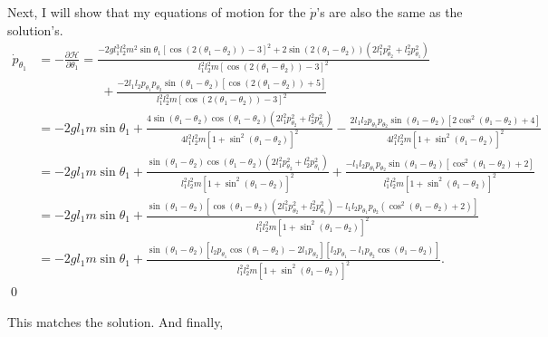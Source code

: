 \documentclass{article}
\theoremstyle{definition}
\newcommand{\p}{\partial}
\newcommand{\ham}{\mathcal{H}}
\newcommand{\f}[2]{\frac{#1}{#2}}
\newcommand{\lb}{\left[}
\newcommand{\rb}{\right]}
\begin{document}
\noindent Next, I will show that my equations of motion for the $\dot{p}$'s are also the same as the solution's.
\begin{align*}
\dot{p}_{\theta_1} &= -\f{\p \ham}{\p \theta_1}  = 
\frac{-2 g l_1^3 l_2^2 m^2 \sin \theta_1[\cos(2 (\theta_1-\theta_2))-3]^2+2 \sin (2(\theta_1-\theta_2)) \left(2 l_1^2p_{\theta_2}^2+l_2^2 p_{\theta_1}^2\right)}{l_1^2 l_2^2 m [\cos (2(\theta_1-\theta_2))-3]^2} \\
&\quad\quad\quad\quad\quad+ \frac{-2l_1l_2 p_{\theta_1}p_{\theta_2} \sin(\theta_1-\theta_2) [\cos (2 (\theta_1-\theta_2))+5]}{l_1^2 l_2^2 m [\cos (2(\theta_1-\theta_2))-3]^2}\\
&= -2gl_1m \sin\theta_1 + \f{4\sin(\theta_1-\theta_2)\cos(\theta_1-\theta_2)\left(2 l_1^2p_{\theta_2}^2+l_2^2 p_{\theta_1}^2\right)}{4l_1^2l_2^2m[1+\sin^2(\theta_1-\theta_2)]^2}
- \frac{2l_1l_2 p_{\theta_1}p_{\theta_2} \sin(\theta_1-\theta_2) [2\cos^2 (\theta_1-\theta_2)+4]}{4l_1^2l_2^2m[1+\sin^2(\theta_1-\theta_2)]^2}\\
&= -2gl_1m \sin\theta_1 + \f{\sin(\theta_1-\theta_2)\cos(\theta_1-\theta_2)\left(2 l_1^2p_{\theta_2}^2+l_2^2 p_{\theta_1}^2\right)}{l_1^2l_2^2m[1+\sin^2(\theta_1-\theta_2)]^2}+ \frac{-l_1l_2 p_{\theta_1}p_{\theta_2} \sin(\theta_1-\theta_2) [\cos^2 (\theta_1-\theta_2)+2]}{l_1^2l_2^2m[1+\sin^2(\theta_1-\theta_2)]^2}\\
&= -2gl_1m \sin\theta_1 + \f{\sin(\theta_1-\theta_2)\lb \cos(\theta_1-\theta_2)\left(2 l_1^2p_{\theta_2}^2+l_2^2 p_{\theta_1}^2\right) -l_1l_2 p_{\theta_1}p_{\theta_2}(\cos^2(\theta_1-\theta_2)+2) \rb}{l_1^2l_2^2m[1+\sin^2(\theta_1-\theta_2)]^2}\\
&= -2gl_1m \sin\theta_1 + \f{\sin(\theta_1-\theta_2)\lb l_2p_{\theta_1}\cos(\theta_1-\theta_2) -2l_1p_{\theta_2} \rb 
\lb l_2p_{\theta_1} - l_1p_{\theta_2}\cos(\theta_1-\theta_2) \rb}
{l_1^2l_2^2m[1+\sin^2(\theta_1-\theta_2)]^2}.
\end{align*}\qed


\noindent This matches the solution. And finally, 
\end{document}
